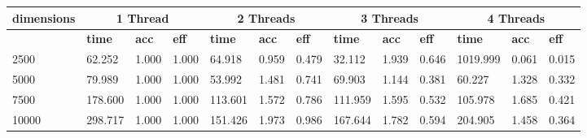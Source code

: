 \documentclass{article}
\begin{document}
\begin{table}[]\begin{tabular}{|l|l|l|l|l|l|l|l|l|l|l|l|l|}\hline
\multicolumn{1}{|c|}{\textbf{dimensions}} & \multicolumn{3}{c|}{\textbf{1 Thread}} & \multicolumn{3}{c|}{\textbf{2 Threads}} & \multicolumn{3}{c|}{\textbf{3 Threads}} & \multicolumn{3}{c|}{\textbf{4 Threads}} \\ \hline
 & \textbf{time} & \textbf{acc} & \textbf{eff} & \textbf{time} & \textbf{acc} & \textbf{eff} & \textbf{time} & \textbf{acc} & \textbf{eff} & \textbf{time} & \textbf{acc} & \textbf{eff}\\ \hline
2500
 & 62.252 & 1.000 & 1.000 & 64.918 & 0.959 & 0.479 & 32.112 & 1.939 & 0.646 & 1019.999 & 0.061 & 0.015\\ \hline
5000
 & 79.989 & 1.000 & 1.000 & 53.992 & 1.481 & 0.741 & 69.903 & 1.144 & 0.381 & 60.227 & 1.328 & 0.332\\ \hline
7500
 & 178.600 & 1.000 & 1.000 & 113.601 & 1.572 & 0.786 & 111.959 & 1.595 & 0.532 & 105.978 & 1.685 & 0.421\\ \hline
10000
 & 298.717 & 1.000 & 1.000 & 151.426 & 1.973 & 0.986 & 167.644 & 1.782 & 0.594 & 204.905 & 1.458 & 0.364\\ \hline
\end{tabular}
\end{table}
\end{document}
